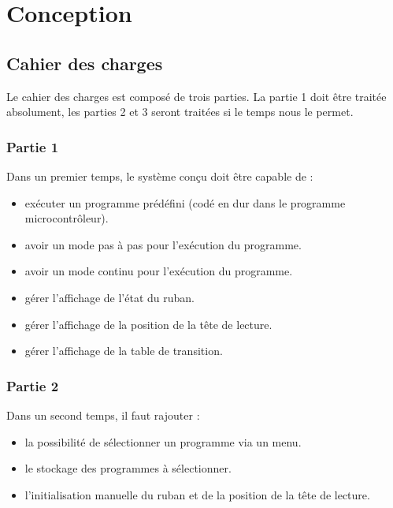 \documentclass[12pt]{article}
\begin{document}
	 \section{Conception}
	 \subsection{Cahier des charges}
	 Le cahier des charges est composé de trois parties. La partie 1 doit être traitée absolument, les parties 2 et 3 seront traitées si le temps nous le permet.
	 \subsubsection{Partie 1}
	 Dans un premier temps, le système conçu doit être capable de :\\
	 \begin{itemize}[label=$-$]
	 	\item exécuter un programme prédéfini (codé en dur dans le programme microcontrôleur).\\
	 	\item avoir un mode pas à pas pour l'exécution du programme.\\
	 	\item avoir un mode continu pour l'exécution du programme.\\
	 	\item gérer l'affichage de l'état du ruban.\\
	 	\item gérer l'affichage de la position de la tête de lecture.\\
	 	\item gérer l'affichage de la table de transition.
	 \end{itemize}
	 \subsubsection{Partie 2}
	 Dans un second temps, il faut rajouter :\\
	 \begin{itemize}[label=$-$]
	 	\item  la possibilité de sélectionner un programme via un menu.\\
	 	\item le stockage des programmes à sélectionner.\\
	 	\item l'initialisation manuelle du ruban et de la position de la tête de lecture.
	 \end{itemize}
\end{document}

